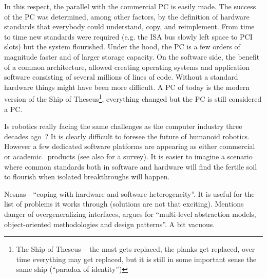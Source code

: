 In this respect, the parallel with the commercial PC is easily made. 
The success of the PC was determined, among other factors, by the definition 
of hardware standards that everybody could understand, copy, and reimplement. 
From time to time new standards were required (e.g. the ISA bus slowly left
space to PCI slots) but the system flourished. Under the hood, the PC is a 
few orders of magnitude faster and of larger
storage capacity. On the software side, the benefit of a common architecture, 
allowed creating operating systems and application software consisting of 
several millions of lines of code. Without a standard hardware things
might have been more difficult.
%
A PC of today is the modern 
version of the Ship of Theseus\footnote{The Ship of 
Theseus -- the mast gets replaced,
the planks get replaced, over time everything may get replaced,
but it is still in some important sense the same ship (``paradox
of identity'')}, everything changed but the PC is still considered
a PC. 
%

Is robotics really facing the same challenges as the computer industry
three decades ago~\cite{gates2007robot}? 
%
It is clearly difficult to foresee the future of humanoid robotics. However
a few dedicated software platforms are appearing as either 
commercial~\cite{microsoft}
or academic~\cite{vaughan2006reusable} products (see also 
\cite{kramer2007development} for a survey). It is
easier %
to imagine a scenario where common standards both in 
software and hardware will find the fertile soil to flourish when 
isolated breakthroughs will happen.




Nesnas \cite{nesnas2006claraty} - ``coping with hardware and software 
heterogeneity''.  It is useful for the list of problems it
works through (solutions are not that exciting).
%
Mentions danger of overgeneralizing interfaces, argues for 
``multi-level abstraction models, object-oriented methodologies
and design patterns''.  A bit vacuous.



